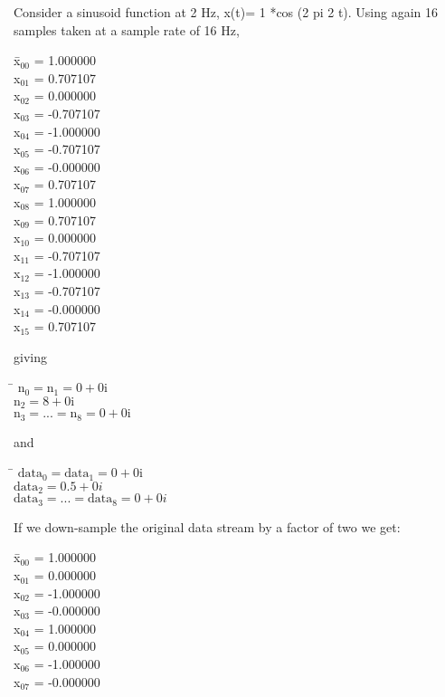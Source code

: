 \documentclass{ligodcc}
\begin{document}
Consider a sinusoid function at 2 Hz, x(t)= 1 *cos (2 pi 2 t). Using again 16 
samples taken at a sample rate of 16 Hz,
\begin{tabbing}
\hspace{2cm} \= x$_{00}$ =  1.000000\\
\> x$_{01}$ =  0.707107\\
\> x$_{02}$ =  0.000000\\
\> x$_{03}$ = -0.707107\\
\> x$_{04}$ = -1.000000\\
\> x$_{05}$ = -0.707107\\
\> x$_{06}$ = -0.000000\\
\> x$_{07}$ =  0.707107\\
\> x$_{08}$ =  1.000000\\
\> x$_{09}$ =  0.707107\\
\> x$_{10}$ =  0.000000\\
\> x$_{11}$ = -0.707107\\
\> x$_{12}$ = -1.000000\\
\> x$_{13}$ = -0.707107\\
\> x$_{14}$ = -0.000000\\
\> x$_{15}$ =  0.707107\\
\end{tabbing}
giving
\begin{tabbing}
\hspace{2cm} \=  $\mathrm{n}_0 = \mathrm{n}_1 =0+0\mathrm{i}$\\
\> $\mathrm{n}_2 = 8+0\mathrm{i}$\\
\> $\mathrm{n}_3 =... = \mathrm{n}_8 = 0+0\mathrm{i}$\\
\end{tabbing}
and
\begin{tabbing}
\hspace{2cm} \=  $\mathrm{data}_0 = \mathrm{data}_1 =0+0\mathrm{i}$\\
\> $\mathrm{data}_2= 0.5+0i$\\
\> $\mathrm{data}_3 = ...= \mathrm{data}_8= 0+0i$\\
\end{tabbing}
If we down-sample the original data stream by a factor of two we get:
\begin{tabbing}
\hspace{2cm} \= x$_{00}$ =  1.000000\\
\> x$_{01}$ =  0.000000\\
\> x$_{02}$ = -1.000000\\
\> x$_{03}$ = -0.000000\\
\> x$_{04}$ =  1.000000\\
\> x$_{05}$ =  0.000000\\
\> x$_{06}$ = -1.000000\\
\> x$_{07}$ = -0.000000\\
\end{tabbing}
\end{document}
